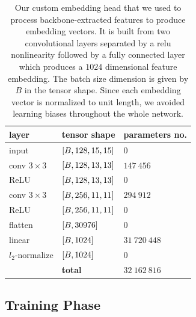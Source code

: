 \begin{table}[!t]
    \centering
    \begin{tabular}{lll}
        \toprule
        \textbf{layer}    & \textbf{tensor shape}        & \textbf{parameters no.} \\
        \midrule
        input             & $\left[ {B, 128, 15, 15} \right]$ & $0$                     \\
        \midrule
        conv $3 \times 3$ & $\left[ {B, 128, 13, 13} \right]$ & $147\ 456$              \\
        ReLU              & $\left[ {B, 128, 13, 13} \right]$ & $0$                     \\
        \midrule
        conv $3 \times 3$ & $\left[ {B, 256, 11, 11} \right]$ & $294\ 912$              \\
        ReLU              & $\left[ {B, 256, 11, 11} \right]$ & $0$                     \\
        \midrule
        flatten           & $\left[ {B, 30976} \right]$       & $0$                     \\
        linear            & $\left[ {B, 1024} \right]$        & $31\ 720\ 448$          \\
        \midrule
        $l_2$-normalize   & $\left[ {B, 1024} \right]$        & $0$                     \\
        \bottomrule
                          & \textbf{total}               & $32\ 162\ 816$          \\
        \cline{2-3}
    \end{tabular}
    \caption[Feature embedding head]{Our custom embedding head that we used to process backbone-extracted features to produce embedding vectors. It is built from two convolutional layers separated by a \gls{relu} nonlinearity followed by a fully connected layer which produces a $1024$ dimensional feature embedding. The batch size dimension is given by $B$ in the tensor shape. Since each embedding vector is normalized to unit length, we avoided learning biases throughout the whole network.}
    \label{tab:FeatureEmbeddingHead}
\end{table}

\subsection{Training Phase}

